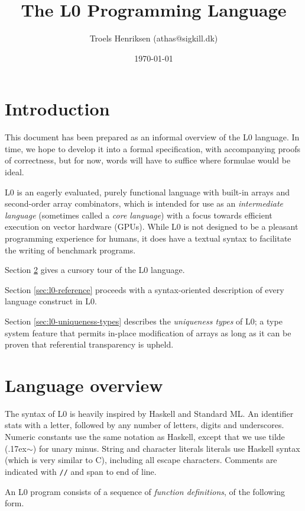 \documentclass[oneside]{memoir}
\title{The L0 Programming Language}
\date{\today}
\author{Troels Henriksen (athas@sigkill.dk)}
\renewcommand\tilde[0]{{\raise.17ex\hbox{$\scriptstyle\sim$}}}
\begin{document}
\maketitle

\section{Introduction}

This document has been prepared as an informal overview of the L0
language.  In time, we hope to develop it into a formal specification,
with accompanying proofs of correctness, but for now, words will have
to suffice where formulae would be ideal.

L0 is an eagerly evaluated, purely functional language with built-in
arrays and second-order array combinators, which is intended for use
as an \emph{intermediate language} (sometimes called a \emph{core
  language}) with a focus towards efficient execution on vector
hardware (GPUs).  While L0 is not designed to be a pleasant
programming experience for humans, it does have a textual syntax to
facilitate the writing of benchmark programs.

Section \ref{sec:l0-overview} gives a cursory tour of the L0 language.

Section \ref{sec:l0-reference} proceeds with a syntax-oriented
description of every language construct in L0.

Section \ref{sec:l0-uniqueness-types} describes the \emph{uniqueness
  types} of L0; a type system feature that permits in-place
modification of arrays as long as it can be proven that referential
transparency is upheld.

\section{Language overview}
\label{sec:l0-overview}

The syntax of L0 is heavily inspired by Haskell and Standard ML.  An
identifier stats with a letter, followed by any number of letters,
digits and underscores.  Numeric constants use the same notation as
Haskell, except that we use tilde (\tilde{}) for unary minus.  String
and character literals literals use Haskell syntax (which is very
similar to C), including all escape characters.  Comments are
indicated with \texttt{//} and span to end of line.

An L0 program consists of a sequence of \emph{function definitions},
of the following form.
\end{document}
